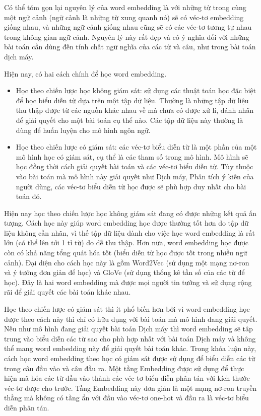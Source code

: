 Có thể tóm gọn lại nguyên lý của word embedding là với những từ trong cùng một ngữ cảnh (ngữ cảnh là những từ xung quanh nó) sẽ có véc-tơ embedding giống nhau, và những ngữ cảnh giống nhau cũng sẽ có các véc-tơ tương tự nhau trong không gian ngữ cảnh. Nguyên lý này rất đẹp và có ý nghĩa đối với những bài toán cần dùng đến tính chất ngữ nghĩa của các từ và câu, như trong bài toán dịch máy.

Hiện nay, có hai cách chính để học word embedding.
\begin{itemize}
	\item Học theo chiến lược học không giám sát: sử dụng các thuật toán học đặc biệt để học biểu diễn từ dựa trên một tập dữ liệu. Thường là những tập dữ liệu thu thập được từ các nguồn khác nhau về mà chưa có được xử lí, đánh nhãn để giải quyết cho một bài toán cụ thể nào. Các tập dữ liệu này thường là dùng để huấn luyện cho mô hình ngôn ngữ.
	\item Học theo chiến lược có giám sát: các véc-tơ biểu diễn từ là một phần của một mô hình học có giám sát, cụ thể là các tham số trong mô hình. Mô hình sẽ học đồng thời cách giải quyết bài toán và các véc-tơ biểu diễn từ. Tùy thuộc vào bài toán mà mô hình này giải quyết như Dịch máy, Phân tích ý kiến của người dùng, các véc-tơ biểu diễn từ học được sẽ phù hợp duy nhất cho bài toán đó.
\end{itemize}

Hiện nay học theo chiến lược học không giám sát đang có được những kết quả ấn tượng. Cách học này giúp word embedding học được thường tốt hơn do tập dữ liệu không cần nhãn, vì thế tập dữ liệu dành cho việc học word embedding là rất lớn (có thể lên tới 1 tỉ từ) do dễ thu thập. Hơn nữa, word embedding học được còn có khả năng tổng quát hóa tốt (biểu diễn từ học được tốt trong nhiều ngữ cảnh). Đại diện cho cách học này là gồm Word2Vec \cite{word2vec2013} (sử dụng một mạng nơ-ron và ý tưởng đơn giản để học) và GloVe \cite{glove2014} (sử dụng thống kê tần số của các từ để học). Đây là hai word embedding mà được mọi người tin tưởng và sử dụng rộng rãi để giải quyết các bài toán khác nhau.

Học theo chiến lược có giám sát thì ít phổ biến hơn bởi vì word embedding học được theo cách này thì chỉ có hữu dụng với bài toán mà mô hình đang giải quyết. Nếu như mô hình đang giải quyết bài toán Dịch máy thì word embedding sẽ tâp trung vào biểu diễn các từ sao cho phù hợp nhất với bài toán Dịch máy và không thể mang word embedding này để giải quyết bài toán khác. Trong khóa luận này, cách học word embedding theo học có giám sát được sử dụng để biểu diễn các từ trong câu đầu vào và câu đầu ra. Một tầng Embedding được sử dụng để thực hiện mã hóa các từ đầu vào thành các véc-tơ biểu diễn phân tán với kích thước véc-tơ được cho trước. Tầng Embedding này đơn giản là một mạng nơ-ron truyền thẳng mà không có tầng ẩn với đầu vào véc-tơ one-hot và đầu ra là véc-tơ biểu diễn phân tán.

